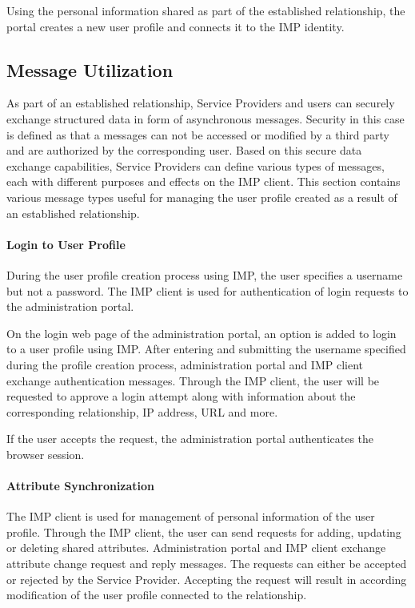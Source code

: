 Using the personal information shared as part of the established relationship, the portal creates a new user profile and connects it to the IMP identity.

\subsection{Message Utilization}
As part of an established relationship, Service Providers and users can securely exchange structured data in form of asynchronous messages. Security in this case is defined as that a messages can not be accessed or modified by a third party and are authorized by the corresponding user. Based on this secure data exchange capabilities, Service Providers can define various types of messages, each with different purposes and effects on the IMP client. This section contains various message types useful for managing the user profile created as a result of an established relationship.

\paragraph{Login to User Profile}
During the user profile creation process using IMP, the user specifies a username but not a password. The IMP client is used for authentication of login requests to the administration portal.

On the login web page of the administration portal, an option is added to login to a user profile using IMP. After entering and submitting the username specified during the profile creation process, administration portal and IMP client exchange authentication messages. Through the IMP client, the user will be requested to approve a login attempt along with information about the corresponding relationship, IP address, URL and more.

If the user accepts the request, the administration portal authenticates the browser session.

\paragraph{Attribute Synchronization}

The IMP client is used for management of personal information of the user profile. Through the IMP client, the user can send requests for adding, updating or deleting shared attributes. Administration portal and IMP client exchange attribute change request and reply messages. The requests can either be accepted or rejected by the Service Provider. Accepting the request will result in according modification of the user profile connected to the relationship.

